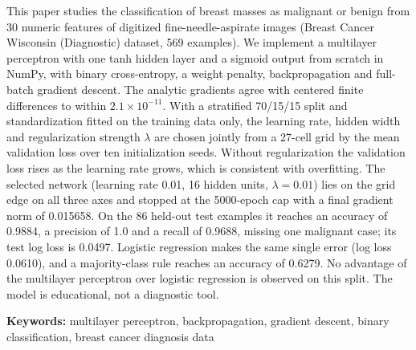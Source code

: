 
\noindent This paper studies the classification of breast masses as malignant or benign from 30 numeric features of digitized fine-needle-aspirate images (Breast Cancer Wisconsin (Diagnostic) dataset, 569 examples). We implement a multilayer perceptron with one tanh hidden layer and a sigmoid output from scratch in NumPy, with binary cross-entropy, a weight penalty, backpropagation and full-batch gradient descent. The analytic gradients agree with centered finite differences to within $2.1\times10^{-11}$. With a stratified 70/15/15 split and standardization fitted on the training data only, the learning rate, hidden width and regularization strength $\lambda$ are chosen jointly from a 27-cell grid by the mean validation loss over ten initialization seeds. Without regularization the validation loss rises as the learning rate grows, which is consistent with overfitting. The selected network (learning rate 0.01, 16 hidden units, $\lambda=0.01$) lies on the grid edge on all three axes and stopped at the 5000-epoch cap with a final gradient norm of 0.015658. On the 86 held-out test examples it reaches an accuracy of 0.9884, a precision of 1.0 and a recall of 0.9688, missing one malignant case; its test log loss is 0.0497. Logistic regression makes the same single error (log loss 0.0610), and a majority-class rule reaches an accuracy of 0.6279. No advantage of the multilayer perceptron over logistic regression is observed on this split. The model is educational, not a diagnostic tool.

\noindent\textbf{Keywords:} multilayer perceptron, backpropagation, gradient descent, binary classification, breast cancer diagnosis data
